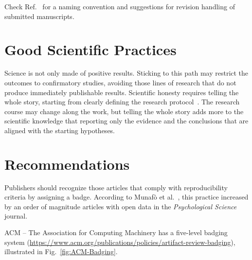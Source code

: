 \documentclass[journal,twopage]{IEEEtran}
\begin{document}
Check Ref.~\cite{EditorialGRSL2015} for a naming convention and suggestions for revision handling of submitted manuscripts.


\section{Good Scientific Practices}

Science is not only made of positive results.
Sticking to this path may restrict the outcomes to confirmatory studies, avoiding those lines of research that do not produce immediately publishable results.
Scientific honesty requires telling the whole story, starting from clearly defining the research protocol~\cite{TellItlikeItIs}.
The research course may change along the work, but telling the whole story adds more to the scientific knowledge that reporting only the evidence and the conclusions that are aligned with the starting hypotheses.

\section{Recommendations}

Publishers should recognize those articles that comply with reproducibility criteria by assigning a badge.
According to Munaf\`o et al.~\cite{ManifestoReproducibleScience}, this practice increased by an order of magnitude articles with open data in the \textit{Psychological Science} journal.

ACM -- The Association for Computing Machinery has a five-level badging system (\url{https://www.acm.org/publications/policies/artifact-review-badging}), illustrated in Fig.~\ref{fig:ACM-Badging}.
\end{document}
